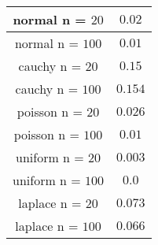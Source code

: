 \begin{tabular}{|c|c|}
\hline
normal n = $20$ & $0.02$\\
\hline
normal n = $100$ & $0.01$\\
\hline
cauchy n = $20$ & $0.15$\\
\hline
cauchy n = $100$ & $0.154$\\
\hline
poisson n = $20$ & $0.026$\\
\hline
poisson n = $100$ & $0.01$\\
\hline
uniform n = $20$ & $0.003$\\
\hline
uniform n = $100$ & $0.0$\\
\hline
laplace n = $20$ & $0.073$\\
\hline
laplace n = $100$ & $0.066$\\
\hline
\end{tabular}